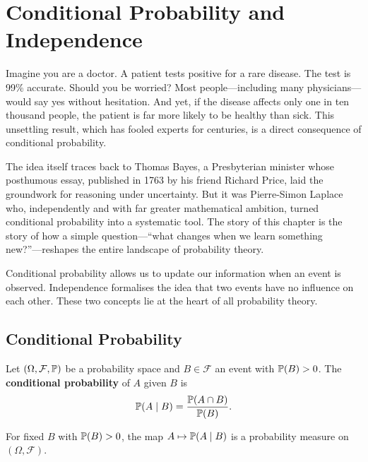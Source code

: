 \chapter{Conditional Probability and Independence}
\label{ch:conditional}

Imagine you are a doctor. A patient tests positive for a rare disease. The test is 99\% accurate. Should you be worried? Most people---including many physicians---would say yes without hesitation. And yet, if the disease affects only one in ten thousand people, the patient is far more likely to be healthy than sick. This unsettling result, which has fooled experts for centuries, is a direct consequence of conditional probability.

The idea itself traces back to Thomas Bayes, a Presbyterian minister whose posthumous essay, published in 1763 by his friend Richard Price, laid the groundwork for reasoning under uncertainty. But it was Pierre-Simon Laplace who, independently and with far greater mathematical ambition, turned conditional probability into a systematic tool. The story of this chapter is the story of how a simple question---``what changes when we learn something new?''---reshapes the entire landscape of probability theory.

\begin{intuition}
Conditional probability allows us to update our information when an event is
observed. Independence formalises the idea that two events have no influence on
each other. These two concepts lie at the heart of all probability theory.
\end{intuition}

\section{Conditional Probability}

\begin{definition}
Let $(\Omega, \mathcal{F}, \mathbb{P})$ be a probability space and $B \in \mathcal{F}$
an event with $\mathbb{P}(B) > 0$. The \textbf{conditional probability} of $A$ given $B$
is
\[
    \mathbb{P}(A \mid B) = \frac{\mathbb{P}(A \cap B)}{\mathbb{P}(B)}.
\]
\end{definition}

\begin{proposition}
For fixed $B$ with $\mathbb{P}(B) > 0$, the map $A \mapsto \mathbb{P}(A \mid B)$ is a
probability measure on $(\Omega, \mathcal{F})$.
\end{proposition}


